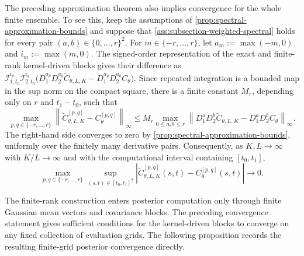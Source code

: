 \documentclass[11pt,a4paper]{article}
\theoremstyle{definition}
\theoremstyle{remark}
\begin{document}
The preceding approximation theorem also implies convergence for the whole finite ensemble. To see this, keep the assumptions of \cref{prop:spectral-approximation-bounds} and suppose that \cref{ass:subsection-weighted-spectral} holds for every pair \((a,b)\in\{0,\ldots,r\}^2\). For \(m\in\{-r,\ldots,r\}\), let \(a_m:=\max(-m,0)\) and \(i_m:=\max(m,0)\). The signed-order representation of the exact and finite-rank kernel-driven blocks gives their difference as \(\mathcal I_{1,t_0}^{i_p}\mathcal I_{2,t_0}^{i_q}\bigl(D_1^{a_p}D_2^{a_q}\widetilde C_{\theta,L,K}-D_1^{a_p}D_2^{a_q}C_\theta\bigr)\). Since repeated integration is a bounded map in the sup norm on the compact square, there is a finite constant \(M_r\), depending only on \(r\) and \(t_1-t_0\), such that
\[
\max_{p,q\in\{-r,\ldots,r\}}
\left\|
\widetilde C_{\theta,L,K}^{[p,q]}-C_\theta^{[p,q]}
\right\|_\infty
\le
M_r
\max_{0\le a,b\le r}
\left\|
D_1^aD_2^b\widetilde C_{\theta,L,K}
-
D_1^aD_2^bC_\theta
\right\|_\infty.
\]
The right-hand side converges to zero by \cref{prop:spectral-approximation-bounds}, uniformly over the finitely many derivative pairs. Consequently, as \(K,L\to\infty\) with \(K/L\to\infty\) and with the computational interval containing \([t_0,t_1]\),
\[
\max_{p,q\in\{-r,\ldots,r\}}
\sup_{(s,t)\in[t_0,t_1]^2}
\left|
\widetilde C_{\theta,L,K}^{[p,q]}(s,t)-C_\theta^{[p,q]}(s,t)
\right|
\to 0.
\]



The finite-rank construction enters posterior computation only through finite Gaussian mean vectors and covariance blocks. The preceding convergence statement gives sufficient conditions for the kernel-driven blocks to converge on any fixed collection of evaluation grids. The following proposition records the resulting finite-grid posterior convergence directly.
\end{document}
